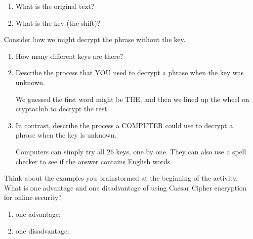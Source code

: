 \begin{enumerate}

\item What is the original text?


\item What is the key (the shift)?


\end{enumerate}


\Q Consider how we might decrypt the phrase without the key.

\begin{enumerate}

\item How many different keys are there?


\item Describe the process that YOU used to decrypt a phrase when the key was unknown.

\begin{answer}
We guessed the first word might be THE, and then we lined up the wheel on cryptoclub to decrypt the rest.
\end{answer}

\item In contrast, describe the process a COMPUTER could use to decrypt a phrase when the key is unknown.

\begin{answer}
Computers can simply try all 26 keys, one by one.
They can also use a spell checker to see if the answer contains English words.
\end{answer}

\end{enumerate}


\Q Think about the examples you brainstormed at the beginning of the activity.
What is one advantage and one disadvantage of using Caesar Cipher encryption for online security?

\begin{enumerate}

\item one advantage: 

\item one disadvantage: 

\end{enumerate}
